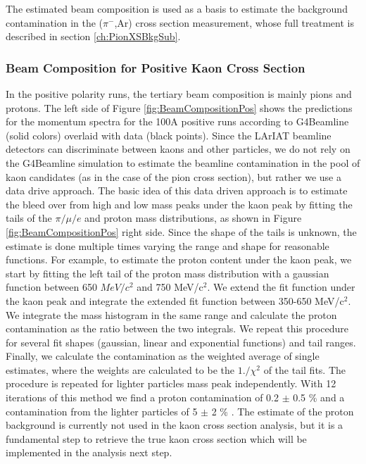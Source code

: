 The estimated beam composition is used as a basis to estimate the background contamination in the  ($\pi^{-}$,Ar) cross section measurement, whose  full treatment is described in section \ref{ch:PionXSBkgSub}.

\subsubsection{Beam Composition for Positive Kaon Cross Section}
In the positive polarity runs, the tertiary beam composition is mainly pions and protons. The left side of Figure \ref{fig:BeamCompositionPos} shows the  predictions for the momentum spectra for the 100A positive runs  according to  G4Beamline (solid colors) overlaid with data (black points). 
Since the LArIAT beamline detectors can discriminate between kaons and other particles, we do not rely on the G4Beamline simulation to estimate the beamline contamination in the pool of kaon candidates (as in the case of the pion cross section), but rather we use a data drive approach. 
The basic idea of this data driven approach is to estimate the bleed over from high and low mass peaks under the kaon peak by fitting the tails of the $\pi/\mu/e$ and proton mass distributions, as shown in Figure \ref{fig:BeamCompositionPos} right side. 
Since the shape of the tails is unknown, the estimate is done multiple times varying the range and shape for reasonable functions. 
For example, to estimate the proton content under the kaon peak, we start by fitting the left tail of the proton mass distribution with a gaussian function between 650 $MeV/c^2$ and 750 MeV/c$^2$.%
  We extend the fit function under the kaon peak and integrate the extended fit function between 350-650 MeV/c$^2$. We integrate the mass histogram in the same range and calculate the proton contamination as the ratio between the two integrals. We repeat this procedure for several fit shapes (gaussian, linear and exponential functions) and tail ranges. Finally, we calculate the contamination as the weighted average of single estimates, where the weights are calculated to be the $1./\chi^2$ of the tail fits. The procedure is repeated for lighter particles mass peak independently.
With 12 iterations of this method we find a proton contamination of  0.2 $\pm$ 0.5 \%  and a contamination from the lighter particles of 5 $\pm$ 2 \% .
The estimate of the proton background is currently not used in the kaon cross section analysis, but it is a fundamental step to retrieve the true kaon cross section which will be implemented in the analysis next step.



